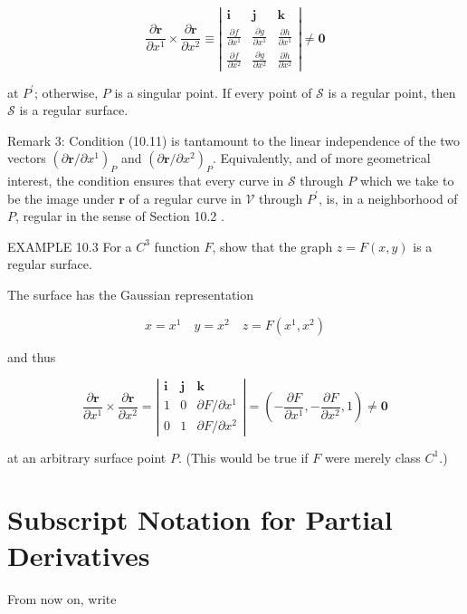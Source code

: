 \documentclass[10pt]{article}
\begin{document}
\[
\frac{\partial \mathbf{r}}{\partial x^{1}} \times \frac{\partial \mathbf{r}}{\partial x^{2}} \equiv\left|\begin{array}{ccc}
\mathbf{i} & \mathbf{j} & \mathbf{k}  \tag{10.11}\\
\frac{\partial f}{\partial x^{1}} & \frac{\partial g}{\partial x^{1}} & \frac{\partial h}{\partial x^{1}} \\
\frac{\partial f}{\partial x^{2}} & \frac{\partial g}{\partial x^{2}} & \frac{\partial h}{\partial x^{2}}
\end{array}\right| \neq \mathbf{0}
\]

at $P^{\prime}$; otherwise, $P$ is a singular point. If every point of $\mathscr{S}$ is a regular point, then $\mathscr{S}$ is a regular surface.

Remark 3: Condition (10.11) is tantamount to the linear independence of the two vectors $\left(\partial \mathbf{r} / \partial x^{1}\right)_{P}$ and $\left(\partial \mathbf{r} / \partial x^{2}\right)_{P}$. Equivalently, and of more geometrical interest, the condition ensures that every curve in $\mathscr{S}$ through $P$ which we take to be the image under $\mathbf{r}$ of a regular curve in $\mathscr{V}$ through $P^{\prime}$, is, in a neighborhood of $P$, regular in the sense of Section 10.2 .

EXAMPLE 10.3 For a $C^{3}$ function $F$, show that the graph $z=F(x, y)$ is a regular surface.

The surface has the Gaussian representation

$$
x=x^{1} \quad y=x^{2} \quad z=F\left(x^{1}, x^{2}\right)
$$

and thus

$$
\frac{\partial \mathbf{r}}{\partial x^{1}} \times \frac{\partial \mathbf{r}}{\partial x^{2}}=\left|\begin{array}{ccc}
\mathbf{i} & \mathbf{j} & \mathbf{k} \\
1 & 0 & \partial F / \partial x^{1} \\
0 & 1 & \partial F / \partial x^{2}
\end{array}\right|=\left(-\frac{\partial F}{\partial x^{1}},-\frac{\partial F}{\partial x^{2}}, 1\right) \neq \mathbf{0}
$$

at an arbitrary surface point $P$. (This would be true if $F$ were merely class $C^{1}$.)

\section*{Subscript Notation for Partial Derivatives}
From now on, write
\end{document}
